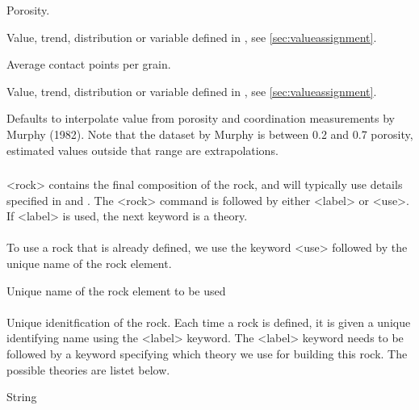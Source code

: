 {
 \slist
   \item \Description Porosity.
   \item \Argument Value, trend, distribution or variable defined in , see \autoref{sec:valueassignment}.
   \item \Default
 \elist

 \slist
   \item \Description Average contact points per grain.
   \item \Argument Value, trend, distribution or variable defined in , see \autoref{sec:valueassignment}.
   \item \Default Defaults to interpolate value from porosity and coordination measurements by Murphy (1982). Note that the dataset by Murphy is between 0.2 and 0.7 porosity, estimated values outside that range are extrapolations.
 \elist

\subsubsection{}
 \slist
   \item \Description <rock> contains the final composition of the rock, and will typically use details specified in  and . The <rock> command is followed by either <label> or <use>. If <label> is used, the next keyword is a theory.
   \item \Argument 
   \item \Default 
 \elist

\paragraph{}
 \slist
   \item \Description To use a rock that is already defined, we use the keyword <use> followed by the unique name of the rock element.
   \item \Argument Unique name of the rock element to be used
   \item \Default 
 \elist

\paragraph{}
 \slist
   \item \Description Unique idenitfication of the rock. Each time a rock is defined, it is given a unique identifying name using
the <label> keyword. The <label> keyword needs to be followed by a keyword specifying which theory we use for building this rock. The possible theories are listet below. 
   \item \Argument String
   \item \Default 
 \elist

}
